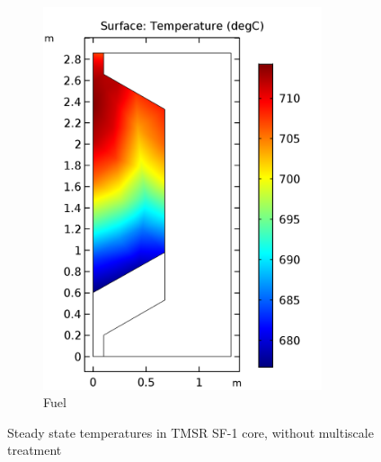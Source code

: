 \documentclass{elsarticle}
\begin{document}
\begin{figure}[h]
\begin{subfigure}[b]{0.3\textwidth}
        \includegraphics[width=0.9\textwidth]{./images/diffusion/tmsr/SS/non_ms/T_fuel(steady_state).png}
        \caption{Fuel}
    \end{subfigure}

  \caption{Steady state temperatures in TMSR SF-1 core, without multiscale treatment}
  \label{fig:tmsr_temp_non_ms_ss}
\end{figure}
\end{document}
